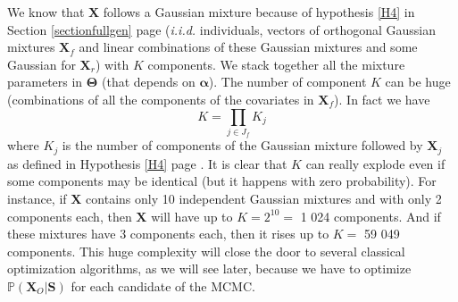 \documentclass[12pt,a4paper]{report}
\begin{document}
	We know that $\boldsymbol{X}$ follows a Gaussian mixture because of hypothesis \ref{H4} in Section \ref{sectionfullgen} page \pageref{H4} ({\it i.i.d.} individuals, vectors of orthogonal Gaussian mixtures $\boldsymbol{X}_f$ and linear combinations of these Gaussian mixtures and some Gaussian for $\boldsymbol{X}_r$) with $K$ components. 
	We stack together all the mixture parameters %
	in $\boldsymbol{\Theta}$ (that depends on $\boldsymbol{\alpha}$). %
	The number of component $K$ can be huge (combinations of all the components of the covariates in $\boldsymbol{X}_f$). In fact we have 
	\begin{equation}
		K=\prod_{j\in J_f}K_j  \nonumber 
	\end{equation}
	where $K_j$ is the number of components of the Gaussian mixture followed by $\boldsymbol{X}_j$ as defined in Hypothesis \ref{H4} page \pageref{H4}. It is clear that $K$ can really explode even if some components may be identical (but it happens with zero probability). For instance, if $\boldsymbol{X}$ contains only 10 independent Gaussian mixtures and with only 2 components each, then $\boldsymbol{X}$ will have up to $K=2^{10}=$ 1 024 components. And if these mixtures have 3 components each, then it rises up to $K=$ 59 049 components. This huge complexity will close the door to several classical optimization algorithms, as we will see later, because we have to optimize $\mathbb{P}(\boldsymbol{X}_O|\boldsymbol{S})$ for each candidate of the MCMC.
%
\end{document}
